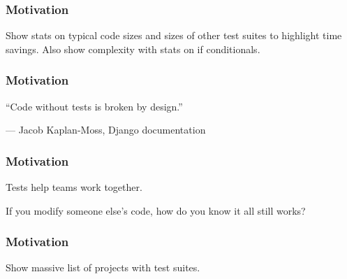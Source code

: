 \begin{frame}
  \frametitle{Motivation}
  Show stats on typical code sizes and sizes of other test suites to highlight
  time savings. Also show complexity with stats on if conditionals.
\end{frame}

\begin{frame}[fragile]
  \frametitle{Motivation}
  \vspace{1cm}
  \epigraph{``Code without tests is broken by design.''}{--- \textup{Jacob Kaplan-Moss}, Django documentation}
\end{frame}

\begin{frame}
  \frametitle{Motivation}
  Tests help teams work together.

  If you modify someone else's code, how do you know it all still works?
\end{frame}

\begin{frame}
  \frametitle{Motivation}
  Show massive list of projects with test suites.
\end{frame}
